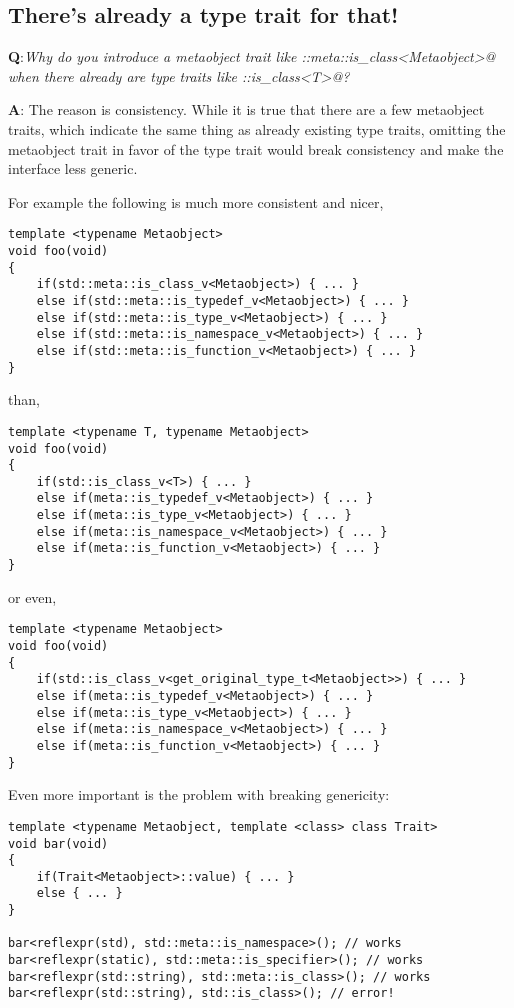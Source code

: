 \subsection{There's already a type trait for that!}

{\textbf Q:}{\em Why do you introduce a metaobject trait like
\verb@std::meta::is_class<Metaobject>@  when there already are type traits like
\verb@std::is_class<T>@?}

{\textbf A:} The reason is consistency.
While it is true that there are a few metaobject traits, which indicate the
same thing as already existing type traits, omitting the metaobject trait
in favor of the type trait would break consistency and make the interface less generic.

For example the following is much more consistent and nicer,

\begin{verbatim}
template <typename Metaobject>
void foo(void)
{
	if(std::meta::is_class_v<Metaobject>) { ... }
	else if(std::meta::is_typedef_v<Metaobject>) { ... }
	else if(std::meta::is_type_v<Metaobject>) { ... }
	else if(std::meta::is_namespace_v<Metaobject>) { ... }
	else if(std::meta::is_function_v<Metaobject>) { ... }
}
\end{verbatim}

than,

\begin{verbatim}
template <typename T, typename Metaobject>
void foo(void)
{
	if(std::is_class_v<T>) { ... }
	else if(meta::is_typedef_v<Metaobject>) { ... }
	else if(meta::is_type_v<Metaobject>) { ... }
	else if(meta::is_namespace_v<Metaobject>) { ... }
	else if(meta::is_function_v<Metaobject>) { ... }
}
\end{verbatim}

or even,

\begin{verbatim}
template <typename Metaobject>
void foo(void)
{
	if(std::is_class_v<get_original_type_t<Metaobject>>) { ... }
	else if(meta::is_typedef_v<Metaobject>) { ... }
	else if(meta::is_type_v<Metaobject>) { ... }
	else if(meta::is_namespace_v<Metaobject>) { ... }
	else if(meta::is_function_v<Metaobject>) { ... }
}
\end{verbatim}

Even more important is the problem with breaking genericity:

\begin{verbatim}
template <typename Metaobject, template <class> class Trait>
void bar(void)
{
	if(Trait<Metaobject>::value) { ... }
	else { ... }
}

bar<reflexpr(std), std::meta::is_namespace>(); // works
bar<reflexpr(static), std::meta::is_specifier>(); // works
bar<reflexpr(std::string), std::meta::is_class>(); // works
bar<reflexpr(std::string), std::is_class>(); // error!
\end{verbatim}


